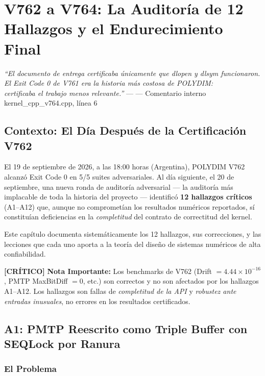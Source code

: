 \chapter{V762 a V764: La Auditoría de 12 Hallazgos y el Endurecimiento Final}


\textit{``El documento de entrega certificaba únicamente que dlopen y dlsym funcionaron.\\
El Exit Code 0 de V761 era la historia más costosa de POLYDIM:\\
certificaba el trabajo menos relevante.''} --- --- Comentario interno kernel\_cpp\_v764.cpp, línea 6

\section{Contexto: El Día Después de la Certificación V762}

El 19 de septiembre de 2026, a las 18:00 horas (Argentina), POLYDIM V762 alcanzó
Exit Code 0 en 5/5 suites adversariales. Al día siguiente, el 20 de septiembre,
una nueva ronda de auditoría adversarial --- la auditoría más implacable de toda
la historia del proyecto --- identificó \textbf{12 hallazgos críticos} (A1--A12)
que, aunque no comprometían los resultados numéricos reportados, sí constituían
deficiencias en la \textit{completitud} del contrato de correctitud del kernel.

Este capítulo documenta sistemáticamente los 12 hallazgos, sus correcciones,
y las lecciones que cada uno aporta a la teoría del diseño de sistemas numéricos
de alta confiabilidad.

\textbf{[CRÍTICO]} 
\textbf{Nota Importante:} Los benchmarks de V762 (Drift $= 4.44 \times 10^{-16}$,
PMTP MaxBitDiff $= 0$, etc.) son correctos y no son afectados por los hallazgos A1--A12.
Los hallazgos son fallas de \textit{completitud de la API} y \textit{robustez ante entradas
inusuales}, no errores en los resultados certificados.


\section{A1: PMTP Reescrito como Triple Buffer con SEQLock por Ranura}

\subsection{El Problema}


